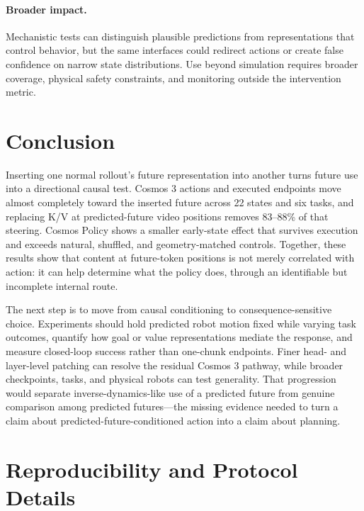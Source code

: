 \documentclass{article}
\begin{document}
\paragraph{Broader impact.}
Mechanistic tests can distinguish plausible predictions from representations that control behavior, but the same interfaces could redirect actions or create false confidence on narrow state distributions. Use beyond simulation requires broader coverage, physical safety constraints, and monitoring outside the intervention metric.

\section{Conclusion}

Inserting one normal rollout's future representation into another turns future use into a directional causal test. Cosmos 3 actions and executed endpoints move almost completely toward the inserted future across 22 states and six tasks, and replacing K/V at predicted-future video positions removes 83--88\% of that steering. Cosmos Policy shows a smaller early-state effect that survives execution and exceeds natural, shuffled, and geometry-matched controls. Together, these results show that content at future-token positions is not merely correlated with action: it can help determine what the policy does, through an identifiable but incomplete internal route.

The next step is to move from causal conditioning to consequence-sensitive choice. Experiments should hold predicted robot motion fixed while varying task outcomes, quantify how goal or value representations mediate the response, and measure closed-loop success rather than one-chunk endpoints. Finer head- and layer-level patching can resolve the residual Cosmos 3 pathway, while broader checkpoints, tasks, and physical robots can test generality. That progression would separate inverse-dynamics-like use of a predicted future from genuine comparison among predicted futures---the missing evidence needed to turn a claim about predicted-future-conditioned action into a claim about planning.

{\small


}

\appendix

\section{Reproducibility and Protocol Details}
\label{app:reproducibility}
\end{document}
